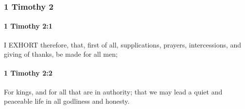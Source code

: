 	\subsubsection{1 Timothy 2} %
		\label{1TIMOTHY-2}
		
		\paragraph{1 Timothy 2:1} %
			\label{1TIMOTHY-2-1}

			I EXHORT therefore, that, first of all, supplications, prayers, intercessions, and giving of thanks, be made for all men;

			\begin{framed}
			\scriptsize
				\begin{compactdesc}
					\item[SBLG] 
				\end{compactdesc}
			\end{framed}

		\paragraph{1 Timothy 2:2} %
			\label{1TIMOTHY-2-2}

			For kings, and for all that are in authority; that we may lead a quiet and peaceable life in all godliness and honesty.

